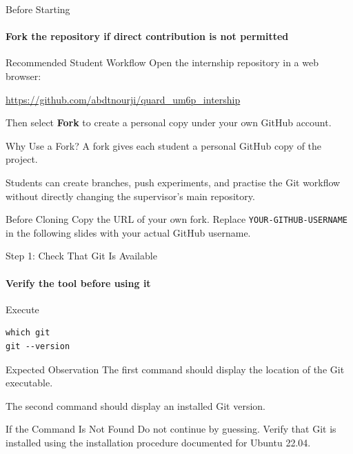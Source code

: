 \begin{frame}{Before Starting}
\framesubtitle{Fork the repository if direct contribution is not permitted}

\footnotesize

\begin{block}{Recommended Student Workflow}
Open the internship repository in a web browser:

\begin{center}
\url{https://github.com/abdtnourji/quard_um6p_intership}
\end{center}

Then select \textbf{Fork} to create a personal copy under your own
GitHub account.
\end{block}

\pause

\begin{exampleblock}{Why Use a Fork?}
A fork gives each student a personal GitHub copy of the project.

Students can create branches, push experiments, and practise the Git
workflow without directly changing the supervisor's main repository.
\end{exampleblock}

\begin{alertblock}{Before Cloning}
Copy the URL of your own fork. Replace
\texttt{YOUR-GITHUB-USERNAME} in the following slides with your actual
GitHub username.
\end{alertblock}

\end{frame}

\begin{frame}[fragile]{Step 1: Check That Git Is Available}
\framesubtitle{Verify the tool before using it}

\footnotesize

\begin{block}{Execute}
\begin{verbatim}
which git
git --version
\end{verbatim}
\end{block}

\begin{exampleblock}{Expected Observation}
The first command should display the location of the Git executable.

The second command should display an installed Git version.
\end{exampleblock}

\begin{alertblock}{If the Command Is Not Found}
Do not continue by guessing. Verify that Git is installed using the
installation procedure documented for Ubuntu 22.04.
\end{alertblock}

\end{frame}

